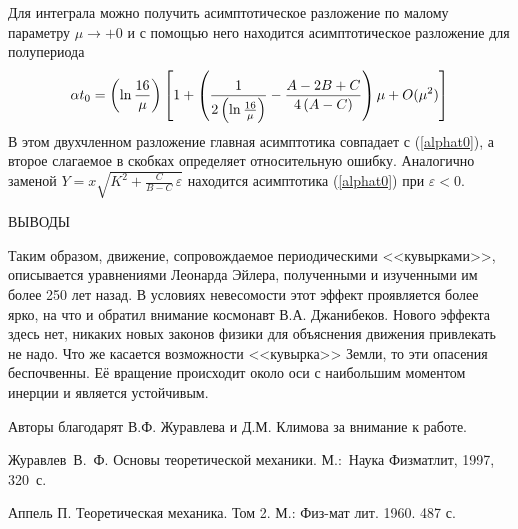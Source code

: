 \documentclass[14pt,a4paper]{extarticle}
\def\eps{\varepsilon}
\begin{document}
Для интеграла можно получить асимптотическое разложение по малому параметру $\mu\rightarrow +0$
и с помощью него находится асимптотическое разложение для полупериода 
$$\alpha t_{0}=
\left( \ln \frac{16}{\mu }\right) \left[ 1+\left( \frac{1}{2\left( \ln \frac{%
16}{\mu }\right) }-\frac{A-2B+C}{4\left( A-C\right) }\right) \mu +O(\mu ^{2})%
\right] $$
В этом двухчленном разложение главная асимптотика совпадает с (\ref{alphat0}), а второе слагаемое в скобках определяет относительную ошибку.
Аналогично заменой $Y=x\sqrt{K^2+\frac{C}{B-C}\,\varepsilon}$ находится асимптотика (\ref{alphat0}) при $\eps<0$. 

{ВЫВОДЫ} 


\smallskip
Таким образом, движение, сопровождаемое периодическими <<кувырками>>, описывается уравнениями Леонарда Эйлера, полученными и изученными им более 250 лет назад. В условиях невесомости этот эффект проявляется более ярко, на что и обратил внимание космонавт В.А. Джанибеков. Нового эффекта здесь нет, никаких новых законов физики для объяснения движения привлекать не надо. Что же касается возможности <<кувырка>> Земли, то эти опасения беспочвенны. Её вращение происходит около оси с наибольшим моментом инерции и является устойчивым.    


\smallskip

Авторы благодарят В.Ф. Журавлева и Д.М. Климова за внимание к работе.

\begin{thebibliography}{99}
 Журавлев~В.~Ф. Основы теоретической механики.
М.:~Наука Физматлит, 1997, 320~с.

 Аппель П. Теоретическая механика. Том 2. М.: Физ-мат лит. 1960. 487 с.
\end{thebibliography}
\end{document}
